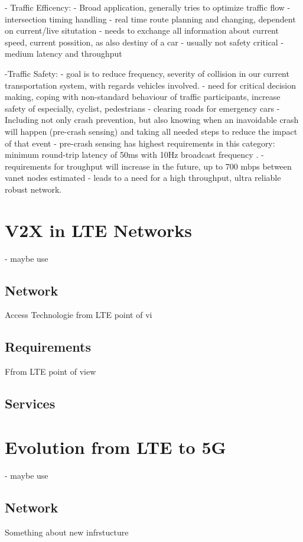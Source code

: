 \documentclass[conference,12pt,onecolumn]{IEEEtran}
\begin{document}
- Traffic Efficency:
- Broad application, generally tries to optimize traffic flow \cite{machardy2018}
- intersection timing handling
- real time route planning and changing, dependent on current/live situtation
- needs to exchange all information about current speed, current possition, as also destiny of a car
- usually not safety critical \cite{machardy2018}
- medium latency and throughput \cite{machardy2018}

-Traffic Safety:
- goal is to reduce frequency, severity of collision in our current transportation system, with regards vehicles involved.
- need for critical decision making, coping with non-standard behaviour of traffic participants, increase safety of especially, cyclist, pedestrians
- clearing roads for emergency cars
- Including not only crash prevention, but also knowing when an inavoidable crash will happen (pre-crash sensing) and taking all needed steps to reduce the impact of that event \cite{machardy2018}
- pre-crash sensing has highest requirements in this category: minimum round-trip latency of 50ms with 10Hz broadcast frequency \cite{machardy2018}.
- requirements for troughput will increase in the future, up to 700 mbps between vanet nodes estimated \cite{machardy2018}
- leads to a need for a high throughput, ultra reliable robust network.

\section{V2X in LTE Networks}
-  maybe  use \cite{araniti2013}
\subsection{Network}
Access Technologie from LTE point of vi

\subsection{Requirements}
Ffrom LTE point of view

\subsection{Services}

\section{Evolution from LTE to 5G}
- maybe use \cite{lee2016}

\subsection{Network}
Something about new infrstucture
\end{document}
